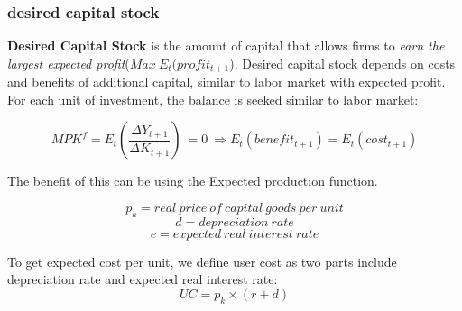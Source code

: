 \documentclass[10pt, a4paper]{article}
\begin{document}
            \subsubsection{desired capital stock}
                \textbf{Desired Capital Stock} is the amount of capital that allows firms to \emph{earn the largest expected profit}($Max\ E_t(profit_{t+1}$). Desired capital stock depends on costs and benefits of additional capital, similar to labor market with expected profit. For each unit of investment, the balance is seeked similar to labor market: 

                $$MPK^f = E_t(\frac{\Delta Y_{t+1}}{\Delta K_{t+1}})\  = 0\  \Rightarrow E_t(benefit_{t+1}) = E_t(cost_{t+1})$$

                The benefit of this can be using the Expected production function.

                $$p_k = real\ price\ of\ capital\ goods\ per\ unit$$
                $$d = depreciation\ rate$$
                $$e = expected\ real\ interest\ rate$$

                To get expected cost per unit, we define user cost as two parts include depreciation rate and expected real interest rate:
                $$UC = p_k \times (r + d)$$
                
                
\end{document}
